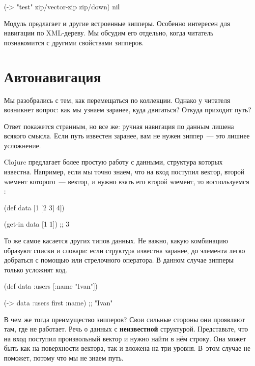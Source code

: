 \begin{english}
  \begin{clojure}
(-> "test"
    zip/vector-zip
    zip/down)
nil
  \end{clojure}
\end{english}

Модуль  предлагает и другие встроенные зипперы. Особенно интересен
 для навигации по XML-дереву. Мы обсудим его отдельно, когда читатель
познакомится с другими свойствами зипперов.

\section{Автонавигация}


Мы разобрались с тем, как перемещаться по коллекции. Однако у читателя возникнет
вопрос: как мы узнаем заранее, куда двигаться? Откуда приходит путь?

Ответ покажется странным, но все же: ручная навигация по данным лишена всякого
смысла. Если путь известен заранее, вам не нужен зиппер~--- это лишнее
усложнение.

Clojure предлагает более простую работу с данными, структура которых
известна. Например, если мы точно знаем, что на вход поступил вектор, второй
элемент которого~--- вектор, и нужно взять его второй элемент, то воспользуемся
:

\begin{english}
  \begin{clojure}
(def data
  [1 [2 3] 4])

(get-in data [1 1])
;; 3
  \end{clojure}
\end{english}

То же самое касается других типов данных. Не важно, какую комбинацию образуют
списки и словари: если структура известна заранее, до элемента легко добраться с
помощью  или стрелочного оператора. В данном случае зипперы только
усложнят код.

\begin{english}
  \begin{clojure}
(def data
  {:users [{:name "Ivan"}]})

(-> data :users first :name)
;; "Ivan"
  \end{clojure}
\end{english}

В чем же тогда преимущество зипперов? Свои сильные стороны они проявляют там,
где  не работает. Речь о данных с \textbf{неизвестной}
структурой. Представьте, что на вход поступил произвольный вектор и нужно найти
в нём строку. Она может быть как на поверхности вектора, так и вложена на три
уровня. В~этом случае  не поможет, потому что мы не знаем путь.


